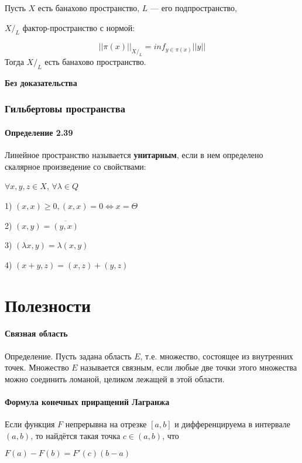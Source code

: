 \documentclass[12pt, english]{article}
\begin{document}
	Пусть $X$ есть банахово пространство, $L$ — его подпространство, 
	
	${X\text{/}_L}$  фактор-пространство 	с нормой:
	

		$$||\pi(x)||_{X\text{/}_L} = inf_{y \in \pi(x)} ||y|| $$
Тогда $X\text{/}_L$ есть банахово пространство.
	
		
	\textbf{Без доказательства}
	
	
\section{Гильбертовы пространства}

\subsection{Определение 2.39}	
	Линейное пространство называется \textbf{унитарным}, если в нем определено скалярное произведение со свойствами:
	
	$\forall x,y,z \in X$, $\forall \lambda \in Q$	
	
	1) $(x, x) \ge 0, (x, x) = 0 \Leftrightarrow x = \Theta$
	
	2) $(x, y) = \overline{(y, x)}$
	
	3) $(\lambda x, y) = \lambda (x, y)$
	
	4) $(x + y, z) = (x, z)+(y, z)$


	
	
	
\newpage
\part{Полезности}
\subsection{Связная область}\label{eq4}
Определение. Пусть задана область $E$, т.е. множество, состоящее из внутренних точек. Множество $E$ называется связным, если любые две точки этого
множества можно соединить ломаной, целиком лежащей в этой области.

\subsection{Формула конечных приращений Лагранжа}\label{eq5}	
Если функция $F$ непрерывна на отрезке $[a,b]$  и дифференцируема в интервале $(a,b)$, то найдётся такая точка $ c\in (a,b)$, что
 
	$F(a) - F(b) = F'(c)(b - a)$
	
\end{document}
